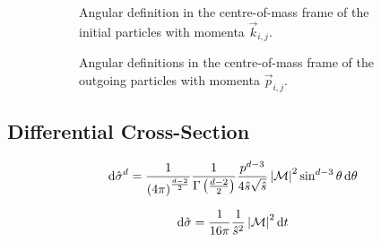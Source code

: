 \documentclass[../main.tex]{subfiles}
\begin{document}
            \begin{figure}
                \centering
                \begin{subfigure}{.49\textwidth}
                    \centering
                    \caption{Angular definition in the centre-of-mass frame of the initial particles with momenta \(\vec{k}_{i,j}\).}
                \end{subfigure}
                \hfill
                \begin{subfigure}{.49\textwidth}
                    \centering
                    \caption{Angular definitions in the centre-of-mass frame of the outgoing particles with momenta \(\vec{p}_{i,j}\).}
                \end{subfigure}
                \caption{}
            \end{figure}



        \subsection{Differential Cross-Section}
            \begin{equation}
                \mathrm{d}\hat{\sigma}^d = \frac{1}{\left(4\pi\right)^{\frac{d-2}{2}}} \frac{1}{\Gamma\left(\frac{d-2}{2}\right)} \frac{p^{d-3}}{4\hat{s}\sqrt{\hat{s}}} \left|\mathcal{M}\right|^2 \sin^{d-3}\theta\, \mathrm{d}\theta
            \end{equation}

            \begin{equation}
                \mathrm{d}\hat{\sigma} = \frac{1}{16\pi} \frac{1}{\hat{s}^2} \left|\mathcal{M}\right|^2 \mathrm{d}t
            \end{equation}

\end{document}
